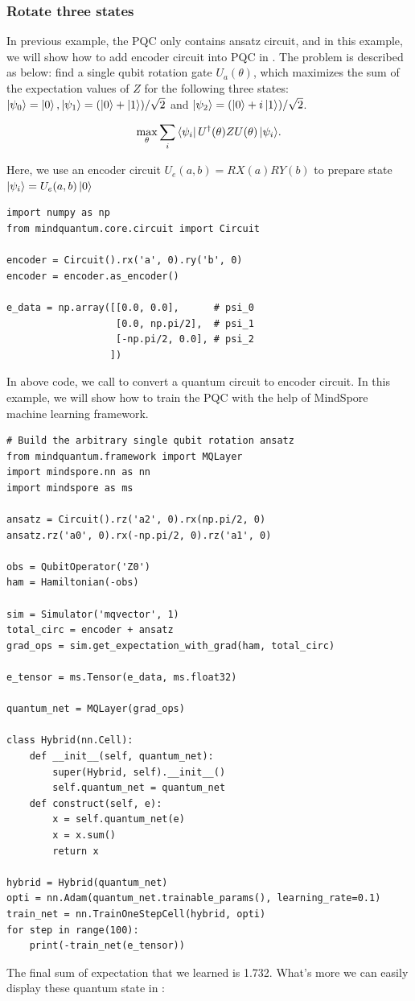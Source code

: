 \subsubsection{Rotate three states}
\label{sec:rotate_three_states}

In previous example, the PQC only contains ansatz circuit, and in this example, we will show how to add encoder circuit into PQC in \MindQuantum. The problem is described as below: find a single qubit rotation gate $U_a(\theta)$, which maximizes the sum of the expectation values of $Z$ for the following three states: $\ket{\psi_0}=\ket{0},\ket{\psi_1}=(\ket{0}+\ket{1})/\sqrt{2}$ and $\ket{\psi_2}=(\ket{0}+i\ket{1})/\sqrt{2}$.

\begin{equation}
  \max_{\theta}\sum_i{\bra{\psi_i}U^\dagger(\theta)ZU(\theta)\ket{\psi_i}}.
\end{equation}

Here, we use an encoder circuit $U_e(a, b) = RX(a)RY(b)$ to prepare state $\ket{\psi_i}=U_e(a, b)\ket{0}$
\begin{lstlisting}
import numpy as np
from mindquantum.core.circuit import Circuit

encoder = Circuit().rx('a', 0).ry('b', 0)
encoder = encoder.as_encoder()

e_data = np.array([[0.0, 0.0],      # psi_0
                   [0.0, np.pi/2],  # psi_1
                   [-np.pi/2, 0.0], # psi_2
                  ])
\end{lstlisting}
In above code, we call \asencoder to convert a quantum circuit to encoder circuit. In this example, we will show how to train the PQC with the help of MindSpore machine learning framework.

\begin{lstlisting}
# Build the arbitrary single qubit rotation ansatz
from mindquantum.framework import MQLayer
import mindspore.nn as nn
import mindspore as ms

ansatz = Circuit().rz('a2', 0).rx(np.pi/2, 0)
ansatz.rz('a0', 0).rx(-np.pi/2, 0).rz('a1', 0)

obs = QubitOperator('Z0')
ham = Hamiltonian(-obs)

sim = Simulator('mqvector', 1)
total_circ = encoder + ansatz
grad_ops = sim.get_expectation_with_grad(ham, total_circ)

e_tensor = ms.Tensor(e_data, ms.float32)

quantum_net = MQLayer(grad_ops)

class Hybrid(nn.Cell):
    def __init__(self, quantum_net):
        super(Hybrid, self).__init__()
        self.quantum_net = quantum_net
    def construct(self, e):
        x = self.quantum_net(e)
        x = x.sum()
        return x

hybrid = Hybrid(quantum_net)
opti = nn.Adam(quantum_net.trainable_params(), learning_rate=0.1)
train_net = nn.TrainOneStepCell(hybrid, opti)
for step in range(100):
    print(-train_net(e_tensor))
\end{lstlisting}
The final sum of expectation that we learned is 1.732. What's more we can easily display these quantum state in \MindQuantum:

